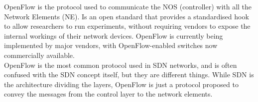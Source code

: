 OpenFlow is the protocol used to communicate the NOS (controller) with all the Network Elements (NE). Is an open standard that provides a standardised hook to allow researchers to run experiments, without requiring vendors to expose the internal workings of their network devices. OpenFlow is currently being implemented by major vendors, with OpenFlow-enabled switches now commercially available.\\

OpenFlow is the most common protocol used in SDN networks, and is often confused with the SDN concept itself, but they are different things. While SDN is the architecture dividing the layers, OpenFlow is just a protocol proposed to convey the messages from the control layer to the network elements.\\